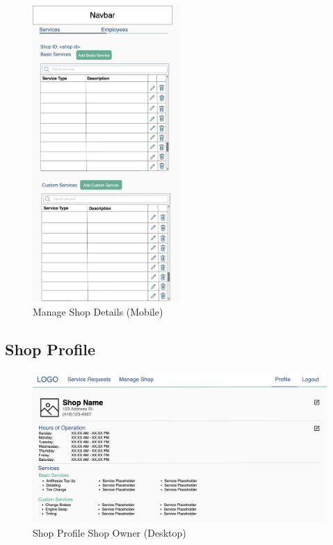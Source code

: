 \documentclass[12pt, titlepage]{article}
\begin{document}
\begin{figure}[H]
	\centering
	\includegraphics[width=0.5\textwidth]{mockups/Manage Shop (Shop Settings) (Mobile).png}
	\caption{Manage Shop \textemdash{} Details (Mobile)}
\end{figure}

\subsection{Shop Profile}

\begin{figure}[H]
	\centering
	\includegraphics[width=\textwidth]{mockups/Shop Profile (Shop Owner) (Desktop).png}
	\caption{Shop Profile \textemdash{} Shop Owner (Desktop)}
\end{figure}
\end{document}
